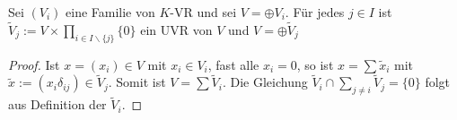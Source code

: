 \begin{lemma}
	Sei $(V_i)$ eine Familie von $K$-VR und sei $V=\oplus V_i$. Für jedes $j\in I$ ist $\tilde V_j :=
	V \times \prod_{i\in I\backslash\{j\}} \{0\}$ ein UVR von $V$ und $V=\oplus \tilde V_j$
\end{lemma}
\begin{proof}
	Ist $x=(x_i)\in V$ mit $x_i\in V_i$, fast alle $x_i=0$, so ist $x=\sum \tilde x_i$ mit $\tilde x:=(x_i\delta_{ij})
	\in \tilde V_j$. Somit ist $V=\sum \tilde V_i$. Die Gleichung $\tilde V_i \cap \sum_{j\neq i} \tilde V_j 
	=\{0\}$ folgt aus Definition der $\tilde V_i.$
\end{proof}